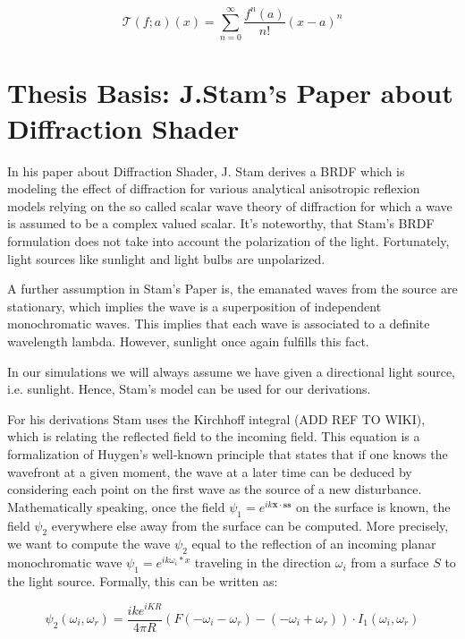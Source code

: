 \begin{equation}
  \mathcal T(f;a)(x) = \sum_{n=0}^{\infty} \frac{f^{n}(a)}{n!}(x-a)^n
  \label{eq:deftaylor}
\end{equation}


\section{Thesis Basis: J.Stam's Paper about Diffraction Shader}
\label{sec:sumstam}
In his paper about Diffraction Shader, J. Stam derives a BRDF which is modeling the effect of diffraction for various analytical anisotropic reflexion models relying on the so called scalar wave theory of diffraction for which a wave is assumed to be a complex valued scalar. 
It's noteworthy, that Stam's BRDF formulation does not take into account the polarization of the light. Fortunately, light sources like sunlight and light bulbs are unpolarized. 

A further assumption in Stam's Paper is, the emanated waves from the source are stationary, which implies the wave is a superposition of independent monochromatic waves. This implies that each wave is associated to a definite wavelength lambda. However, sunlight once again fulfills this fact.

In our simulations we will always assume we have given a directional light source, i.e. sunlight. Hence, Stam's model can be used for our derivations.

For his derivations Stam uses the Kirchhoff integral (ADD REF TO WIKI), which is relating the reflected field to the incoming field. This equation is a formalization of Huygen’s well-known principle that states that if one knows the wavefront at a given moment, the wave at a later time can be deduced by considering each point on the first wave as the source of a new disturbance. Mathematically speaking, once the field  $\psi_1 =  e^{ik\mathbf{x} \cdot \mathbf{s}\mathbf{s}}$ on the surface is known, the field $\psi_2$ everywhere else away from the surface can be computed.
More precisely, we want to compute the wave $\psi_2$ equal to the reflection of an incoming planar monochromatic wave $\psi_1 = e^{ik \omega_i * x}$  traveling in the direction $\omega_i$ from a surface $S$ to the light source. Formally, this can be written as:

\begin{equation}
\psi_{2}(\omega_i, \omega_r) = \frac{i k e^{i K R}}{4 \pi R} (F(-\omega_i-\omega_r)-(-\omega_i+\omega_r)) \cdot I_{1}(\omega_i, \omega_r) 
\label{eq:kirchhoff}
\end{equation}

